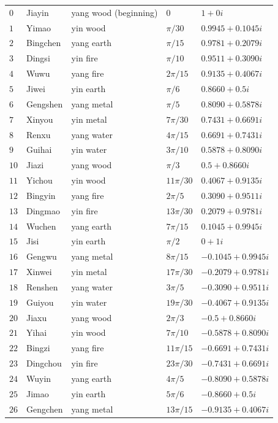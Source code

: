 \begin{longtable}{>{\centering\arraybackslash}p{0.8cm}>{\centering\arraybackslash}p{2.4cm}>{\centering\arraybackslash}p{2.2cm}>{\centering\arraybackslash}p{2cm}>{\centering\arraybackslash}p{3.5cm}}
$0$ & Jiayin & yang wood (beginning) & $0$ & $1+0i$ \\
$1$ & Yimao & yin wood & $\pi/30$ & $0.9945+0.1045i$ \\
$2$ & Bingchen & yang earth & $\pi/15$ & $0.9781+0.2079i$ \\
$3$ & Dingsi & yin fire & $\pi/10$ & $0.9511+0.3090i$ \\
$4$ & Wuwu & yang fire & $2\pi/15$ & $0.9135+0.4067i$ \\
$5$ & Jiwei & yin earth & $\pi/6$ & $0.8660+0.5i$ \\
$6$ & Gengshen & yang metal & $\pi/5$ & $0.8090+0.5878i$ \\
$7$ & Xinyou & yin metal & $7\pi/30$ & $0.7431+0.6691i$ \\
$8$ & Renxu & yang water & $4\pi/15$ & $0.6691+0.7431i$ \\
$9$ & Guihai & yin water & $3\pi/10$ & $0.5878+0.8090i$ \\
$10$ & Jiazi & yang wood & $\pi/3$ & $0.5+0.8660i$ \\
$11$ & Yichou & yin wood & $11\pi/30$ & $0.4067+0.9135i$ \\
$12$ & Bingyin & yang fire & $2\pi/5$ & $0.3090+0.9511i$ \\
$13$ & Dingmao & yin fire & $13\pi/30$ & $0.2079+0.9781i$ \\
$14$ & Wuchen & yang earth & $7\pi/15$ & $0.1045+0.9945i$ \\
$15$ & Jisi & yin earth & $\pi/2$ & $0+1i$ \\
$16$ & Gengwu & yang metal & $8\pi/15$ & $-0.1045+0.9945i$ \\
$17$ & Xinwei & yin metal & $17\pi/30$ & $-0.2079+0.9781i$ \\
$18$ & Renshen & yang water & $3\pi/5$ & $-0.3090+0.9511i$ \\
$19$ & Guiyou & yin water & $19\pi/30$ & $-0.4067+0.9135i$ \\
$20$ & Jiaxu & yang wood & $2\pi/3$ & $-0.5+0.8660i$ \\
$21$ & Yihai & yin wood & $7\pi/10$ & $-0.5878+0.8090i$ \\
$22$ & Bingzi & yang fire & $11\pi/15$ & $-0.6691+0.7431i$ \\
$23$ & Dingchou & yin fire & $23\pi/30$ & $-0.7431+0.6691i$ \\
$24$ & Wuyin & yang earth & $4\pi/5$ & $-0.8090+0.5878i$ \\
$25$ & Jimao & yin earth & $5\pi/6$ & $-0.8660+0.5i$ \\
$26$ & Gengchen & yang metal & $13\pi/15$ & $-0.9135+0.4067i$ \\

\end{longtable}
